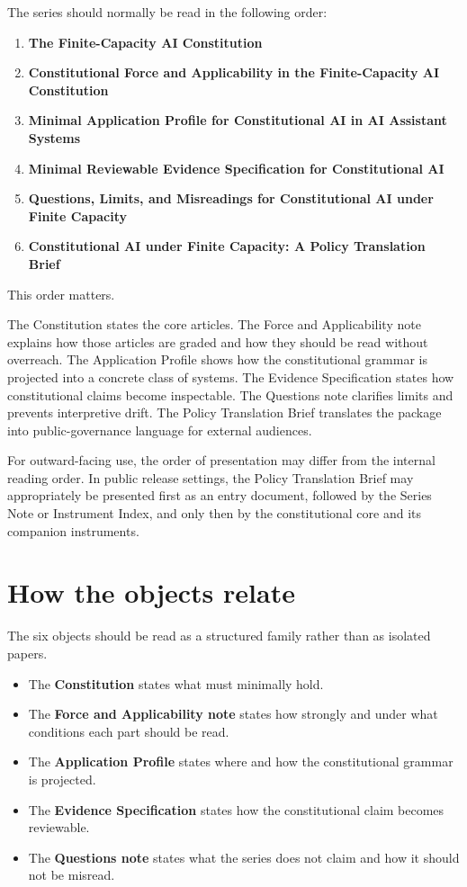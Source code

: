 \documentclass[11pt]{article}
\begin{document}
The series should normally be read in the following order:
\begin{enumerate}[leftmargin=2em]
    \item \textbf{The Finite-Capacity AI Constitution}
    \item \textbf{Constitutional Force and Applicability in the Finite-Capacity AI Constitution}
    \item \textbf{Minimal Application Profile for Constitutional AI in AI Assistant Systems}
    \item \textbf{Minimal Reviewable Evidence Specification for Constitutional AI}
    \item \textbf{Questions, Limits, and Misreadings for Constitutional AI under Finite Capacity}
    \item \textbf{Constitutional AI under Finite Capacity: A Policy Translation Brief}
\end{enumerate}

This order matters.

The Constitution states the core articles.  
The Force and Applicability note explains how those articles are graded and how they should be read without overreach.  
The Application Profile shows how the constitutional grammar is projected into a concrete class of systems.  
The Evidence Specification states how constitutional claims become inspectable.  
The Questions note clarifies limits and prevents interpretive drift.
The Policy Translation Brief translates the package into public-governance language for external audiences.

For outward-facing use, the order of presentation may differ from the internal reading order. In public release settings, the Policy Translation Brief may appropriately be presented first as an entry document, followed by the Series Note or Instrument Index, and only then by the constitutional core and its companion instruments.

\section{How the objects relate}

The six objects should be read as a structured family rather than as isolated papers.

\begin{itemize}[leftmargin=2em]
    \item The \textbf{Constitution} states what must minimally hold.
    \item The \textbf{Force and Applicability note} states how strongly and under what conditions each part should be read.
    \item The \textbf{Application Profile} states where and how the constitutional grammar is projected.
    \item The \textbf{Evidence Specification} states how the constitutional claim becomes reviewable.
    \item The \textbf{Questions note} states what the series does not claim and how it should not be misread.
\end{itemize}
\end{document}
